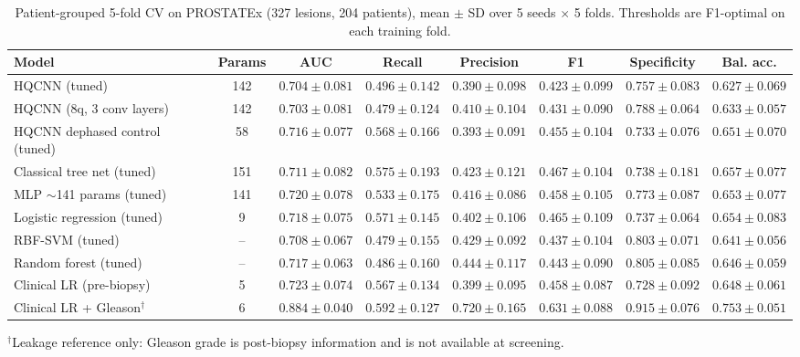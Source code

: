 \begin{table}[t]
\centering
\caption{Patient-grouped 5-fold CV on PROSTATEx (327 lesions, 204 patients), mean $\pm$ SD over 5 seeds $\times$ 5 folds. Thresholds are F1-optimal on each training fold.}
\label{tab:v3_cv}
\small
\begin{tabular}{lccccccc}
\toprule
Model & Params & AUC & Recall & Precision & F1 & Specificity & Bal. acc. \\
\midrule
HQCNN (tuned) & 142 & $0.704 \pm 0.081$ & $0.496 \pm 0.142$ & $0.390 \pm 0.098$ & $0.423 \pm 0.099$ & $0.757 \pm 0.083$ & $0.627 \pm 0.069$ \\
HQCNN (8q, 3 conv layers) & 142 & $0.703 \pm 0.081$ & $0.479 \pm 0.124$ & $0.410 \pm 0.104$ & $0.431 \pm 0.090$ & $0.788 \pm 0.064$ & $0.633 \pm 0.057$ \\
HQCNN dephased control (tuned) & 58 & $0.716 \pm 0.077$ & $0.568 \pm 0.166$ & $0.393 \pm 0.091$ & $0.455 \pm 0.104$ & $0.733 \pm 0.076$ & $0.651 \pm 0.070$ \\
Classical tree net (tuned) & 151 & $0.711 \pm 0.082$ & $0.575 \pm 0.193$ & $0.423 \pm 0.121$ & $0.467 \pm 0.104$ & $0.738 \pm 0.181$ & $0.657 \pm 0.077$ \\
MLP $\sim$141 params (tuned) & 141 & $0.720 \pm 0.078$ & $0.533 \pm 0.175$ & $0.416 \pm 0.086$ & $0.458 \pm 0.105$ & $0.773 \pm 0.087$ & $0.653 \pm 0.077$ \\
Logistic regression (tuned) & 9 & $0.718 \pm 0.075$ & $0.571 \pm 0.145$ & $0.402 \pm 0.106$ & $0.465 \pm 0.109$ & $0.737 \pm 0.064$ & $0.654 \pm 0.083$ \\
RBF-SVM (tuned) & -- & $0.708 \pm 0.067$ & $0.479 \pm 0.155$ & $0.429 \pm 0.092$ & $0.437 \pm 0.104$ & $0.803 \pm 0.071$ & $0.641 \pm 0.056$ \\
Random forest (tuned) & -- & $0.717 \pm 0.063$ & $0.486 \pm 0.160$ & $0.444 \pm 0.117$ & $0.443 \pm 0.090$ & $0.805 \pm 0.085$ & $0.646 \pm 0.059$ \\
Clinical LR (pre-biopsy) & 5 & $0.723 \pm 0.074$ & $0.567 \pm 0.134$ & $0.399 \pm 0.095$ & $0.458 \pm 0.087$ & $0.728 \pm 0.092$ & $0.648 \pm 0.061$ \\
Clinical LR + Gleason$^{\dagger}$ & 6 & $0.884 \pm 0.040$ & $0.592 \pm 0.127$ & $0.720 \pm 0.165$ & $0.631 \pm 0.088$ & $0.915 \pm 0.076$ & $0.753 \pm 0.051$ \\
\bottomrule
\end{tabular}
\par\smallskip\footnotesize $^{\dagger}$Leakage reference only: Gleason grade is post-biopsy information and is not available at screening.
\end{table}
